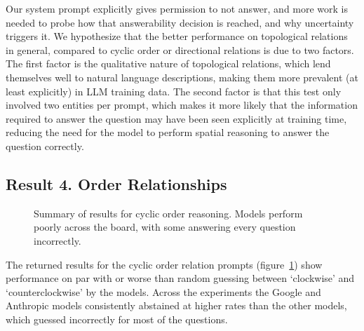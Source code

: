 Our system prompt explicitly gives permission to not answer, and more work is needed to probe how that answerability decision is reached, and why uncertainty triggers it. 
We hypothesize that the better performance on topological relations in general, compared to cyclic order or directional relations is due to two factors.
The first factor is the qualitative nature of topological relations, which lend themselves well to natural language descriptions, making them more prevalent (at least explicitly) in LLM training data.
The second factor is that this test only involved two entities per prompt, which makes it more likely that the information required to answer the question may have been seen explicitly at training time, reducing the need for the model to perform spatial reasoning to answer the question correctly.



\subsection{Result 4. Order Relationships}

\begin{figure}
    \centering
    
    \caption{Summary of results for cyclic order reasoning. Models perform poorly across the board, with some answering every question incorrectly.}
    \label{fig:order}
\end{figure}

The returned results for the cyclic order relation prompts (figure~\ref{fig:order}) show performance on par with or worse than random guessing between `clockwise' and `counterclockwise' by the models.
Across the experiments the Google and Anthropic models consistently abstained at higher rates than the other models, which guessed incorrectly for most of the questions.











